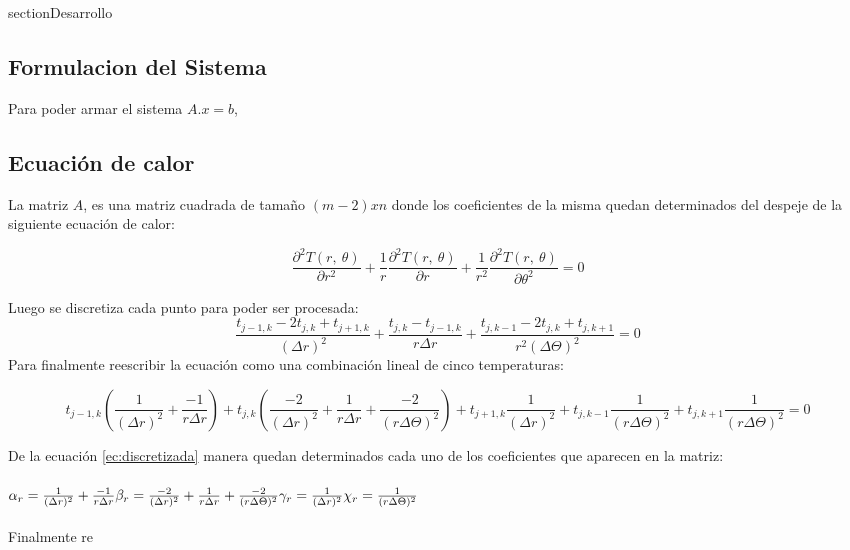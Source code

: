 section{Desarrollo}

\subsection{Formulacion del Sistema}

Para poder armar el sistema $A.x = b $, 

\subsection{Ecuación de calor}

La matriz $A$, es una matriz cuadrada de tamaño $(m-2) x n$ donde los coeficientes de la misma quedan determinados del despeje de la siguiente ecuación de calor:

\begin{equation} \label{ecu:calor}
	\frac{\partial^2T(r,\ \theta)}{\partial r^2} + \frac{1}{r} \frac{\partial^2T(r,\ \theta)}{\partial r} + \frac{1}{r^2} \frac{\partial^2T(r,\ \theta)}{\partial\theta^2} = 0
\end{equation}

  	Luego se discretiza cada punto para poder ser procesada: 
\begin{equation} 
  	\frac{t_{j-1,k} - 2t_{j,k}+t_{j+1,k}}{(\Delta r)^2}+\frac{t_{j,k} - t_{j-1,k}}{r \Delta r}+ \frac{t_{j,k-1} - 2t_{j,k} + t_{j,k+1}}{r^2 (\Delta \Theta)^2} = 0  	
\end{equation}  	
Para finalmente reescribir la ecuación como una combinación lineal de cinco temperaturas:

\begin{equation} \label{ec:discretizada}
	t_{j-1,k} (\frac{1}{(\Delta r)^{2}} + \frac{-1}{r \Delta r}) + t_{j,k} (\frac{-2}{(\Delta r)^2} + \frac{1}{r \Delta r} + \frac{-2}{(r \Delta \Theta)^{2}}) + t_{j+1,k} \frac{1}{(\Delta r)^{2}} + t_{j,k-1} \frac{1}{(r \Delta \Theta)^{2}} + t_{j,k+1} \frac{1}{(r\Delta \Theta)^{2}} = 0
\end{equation}  

De la ecuación \ref{ec:discretizada} manera quedan determinados cada uno de los coeficientes que aparecen en la matriz: \\
\\
\(
\alpha_r = \frac{1}{(\Delta r)^{2}} + \frac{-1}{r \Delta r} \\
\beta_r = \frac{-2}{(\Delta r)^2} + \frac{1}{r \Delta r} + \frac{-2}{(r \Delta \Theta)^{2}} \\
\gamma_r = \frac{1}{(\Delta r)^{2}} \\ 
\chi_r = \frac{1}{(r \Delta \Theta)^{2}}
\) \\\\

Finalmente re
 \label{ecuación}

